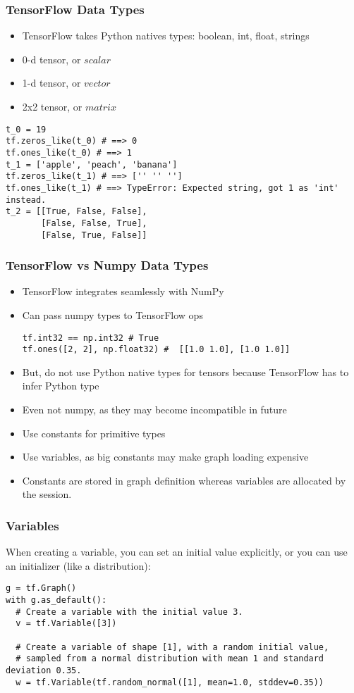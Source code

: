 \begin{frame}[fragile] \frametitle{TensorFlow Data Types}
\begin{itemize}
\item TensorFlow takes Python natives types: boolean, int, float, strings
\item 0-d tensor, or $scalar$ 
\item 1-d tensor, or $vector$
\item 2x2 tensor, or $matrix$
\end{itemize}
\begin{lstlisting}
t_0 = 19 
tf.zeros_like(t_0) # ==> 0
tf.ones_like(t_0) # ==> 1
t_1 = ['apple', 'peach', 'banana']
tf.zeros_like(t_1) # ==> ['' '' '']
tf.ones_like(t_1) # ==> TypeError: Expected string, got 1 as 'int' instead.
t_2 = [[True, False, False],
       [False, False, True],
       [False, True, False]] 
\end{lstlisting}
\end{frame}

\begin{frame}[fragile] \frametitle{TensorFlow vs Numpy Data Types}
\begin{itemize}
\item TensorFlow integrates seamlessly with NumPy
\item Can pass numpy types to TensorFlow ops
\begin{lstlisting}
tf.int32 == np.int32 # True
tf.ones([2, 2], np.float32) #  [[1.0 1.0], [1.0 1.0]]
\end{lstlisting}
\item But, do not use Python native types for tensors because TensorFlow has to infer Python type
\item Even not numpy, as they may become incompatible in future
\item Use constants for primitive types
\item Use variables, as big constants may make graph loading expensive
\item Constants are stored in graph definition whereas variables are allocated by the session.
\end{itemize}

\end{frame}


\begin{frame}[fragile] \frametitle{Variables}
When creating a variable, you can set an initial value explicitly, or you can use an initializer (like a distribution):
\begin{lstlisting}
g = tf.Graph()
with g.as_default():
  # Create a variable with the initial value 3.
  v = tf.Variable([3])

  # Create a variable of shape [1], with a random initial value,
  # sampled from a normal distribution with mean 1 and standard deviation 0.35.
  w = tf.Variable(tf.random_normal([1], mean=1.0, stddev=0.35))
\end{lstlisting}
\end{frame}


